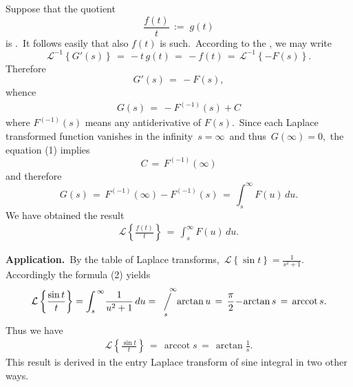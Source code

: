 \documentclass[12pt]{article}
\DeclareMathOperator{\arccot}{arccot}
\newcommand{\sijoitus}[2]%
{\operatornamewithlimits{\Big/}_{\!\!\!#1}^{\,#2}}
\begin{document}
Suppose that the quotient
$$\frac{f(t)}{t} \,:=\; g(t)$$
is .\, It follows easily that also $f(t)$ is such.\, According to the , we may write
$$\mathcal{L}^{-1}\left\{G'(s)\right\} \,=\, -t\,g(t) \,=\, -f(t) \,=\, \mathcal{L}^{-1}\left\{-F(s)\right\}.$$
Therefore
$$G'(s) \,=\, -F(s),$$
whence
\begin{align}
G(s) \,=\, -F^{(-1)}(s)+C
\end{align}
where $F^{(-1)}(s)$ means any antiderivative of $F(s)$.\, Since each Laplace transformed function vanishes in the infinity \,$s = \infty$\, and thus\, $G(\infty) = 0$,\, the equation (1) implies
$$C \,=\, F^{(-1)}(\infty)$$
and therefore
$$G(s) \,=\, F^{(-1)}(\infty)\!-\!F^{(-1)}(s) \,=\, \int_s^\infty F(u)\,du.$$
We have obtained the result
\begin{align}
\mathcal{L}\left\{\frac{f(t)}{t}\right\} \,=\, \int_s^\infty F(u)\,du.
\end{align}


\textbf{Application.}\, By the table of Laplace transforms,\, 
$\displaystyle\mathcal{L}\left\{\sin{t}\right\} = \frac{1}{s^2+1}.$\, Accordingly the formula (2) yields
$$\mathcal{L}\left\{\frac{\sin{t}}{t}\right\} = \int_s^{\,\infty}\!\frac{1}{u^2+1}\,du
= \sijoitus{s}{\quad\infty}\!\arctan{u} \,=\, \frac{\pi}{2}\!-\!\arctan{s} \,=\, \arccot{s}.$$
Thus we have
\begin{align}
\mathcal{L}\left\{\frac{\sin{t}}{t}\right\} \,=\, \arccot{s} \,=\, \arctan\frac{1}{s}.
\end{align}
This result is derived in the entry Laplace transform of sine integral in two other ways.




\end{document}
